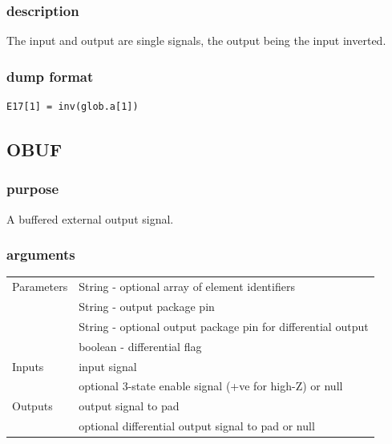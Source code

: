 \documentclass[10pt,a4paper,twoside,fleqn]{book}
\begin{document}
                \subsubsection{description}

                    The input and output are single signals, the output being the
                    input inverted.

                \subsubsection{dump format}

                    \begin{lstlisting}[gobble=20, language=tde]
                        E17[1] = inv(glob.a[1])
                    \end{lstlisting}


            \subsection{OBUF}

                \subsubsection{purpose}

                    A buffered external output signal.

                \subsubsection{arguments}

                    \begin{tabular}{| l | l |}
                    \hline
                    Parameters  & String  - optional array of element identifiers \\
                                & String  - output package pin \\
                                & String  - optional output package pin for differential output\\
                                & boolean - differential flag \\
                    \hline
                    Inputs      & input signal \\
                                & optional 3-state enable signal (+ve for high-Z) or null\\
                    \hline
                    Outputs     & output signal to pad \\
                                & optional differential output signal to pad or null \\
                    \hline
                    \end{tabular}
                    
\end{document}
